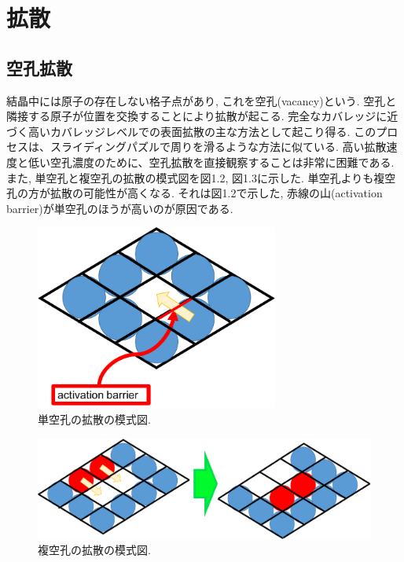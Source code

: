 \section{拡散}
\subsection{空孔拡散}
結晶中には原子の存在しない格子点があり, これを空孔(vacancy)という. 空孔と隣接する原子が位置を交換することにより拡散が起こる.
完全なカバレッジに近づく高いカバレッジレベルでの表面拡散の主な方法として起こり得る. このプロセスは、スライディングパズルで周りを滑るような方法に似ている. 高い拡散速度と低い空孔濃度のために、空孔拡散を直接観察することは非常に困難である. また, 単空孔と複空孔の拡散の模式図を図1.2, 図1.3に示した. 単空孔よりも複空孔の方が拡散の可能性が高くなる. それは図1.2で示した, 赤線の山(activation barrier)が単空孔のほうが高いのが原因である.

\begin{figure}[htbp]
	\begin{center}
		\includegraphics[width=80mm]{../intro/monovacancy.png}
        \caption{単空孔の拡散の模式図.}
		\label{default}
	\end{center}
\end{figure}

\begin{figure}[htbp]
	\begin{center}
		\includegraphics[width=130mm]{../intro/divacancy.png}
        \caption{複空孔の拡散の模式図.}
		\label{default}
	\end{center}
\end{figure}


